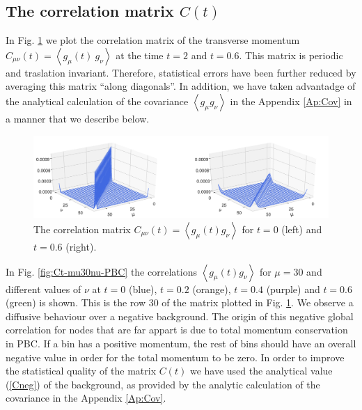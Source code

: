 \documentclass[b5paper,openright,11pt]{book}
\newcommand{\llangle}{\left\langle}
\newcommand{\rrangle}{\right\rangle}
\begin{document}
\subsection{The correlation matrix $C(t)$}

In  Fig. \ref{fig:Ct-matrix-PBC} we  plot the  correlation  matrix of  the
transverse     momentum      $C_{\mu\nu}(t)=\llangle     g_{\mu}(t)\
g_\nu\rrangle$ at  the time  $t=2$ and $t=0.6$.  This  matrix is  periodic and
traslation invariant.  Therefore, statistical errors have been further
reduced by averaging this matrix ``along diagonals''.  In addition, we
have taken advantadge of the  analytical calculation of the covariance
$\llangle g_{\mu} g_\nu\rrangle$ in the Appendix \ref{Ap:Cov} in a
manner that we describe below.

\begin{figure}[h!]
\centering
\includegraphics[width=\linewidth]{Ct-matrix-PBC}
\caption[Correlation matrix $C(t)$ at $t=0$ and $t=0.6$ for PBC system.]{The   correlation    matrix   $C_{\mu\nu}(t)=\llangle
g_{\mu}(t)  g_\nu\rrangle$ for  $t=0$ (left) and $t=0.6$ (right).}
\label{fig:Ct-matrix-PBC}
\end{figure}

In  Fig.    \ref{fig:Ct-mu30nu-PBC}  the   correlations  $\llangle
g_{\mu}(t)  g_\nu\rrangle$ for  $\mu=30$ and  different values  of
$\nu$ at $t=0$ (blue), $t=0.2$ (orange), $t=0.4$ (purple) and $t= 0.6$ (green) is shown.  This is the row 30 of the matrix plotted
in Fig. \ref{fig:Ct-matrix-PBC}.  We  observe a diffusive
behaviour over  a negative  background.  The  origin of  this negative
global  correlation for  nodes that  are far  appart is  due to  total
momentum conservation in PBC.  If a bin has  a positive momentum, the rest of
bins should  have an  overall negative  value in  order for  the total
momentum to  be zero. In order  to improve the statistical  quality of
the matrix  $C(t)$ we have  used the analytical value  (\ref{Cneg}) of
the  background,  as  provided  by the  analytic  calculation  of  the
covariance in the Appendix \ref{Ap:Cov}.
\end{document}
